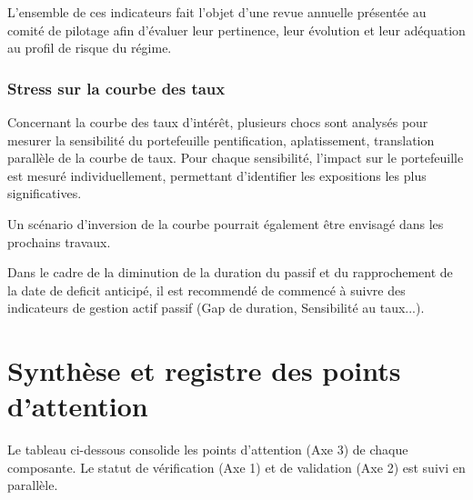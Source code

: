 \documentclass[11pt,a4paper]{article}
\begin{document}
L'ensemble de ces indicateurs fait l'objet d'une revue annuelle présentée au comité de pilotage afin d'évaluer leur pertinence, leur évolution et leur adéquation au profil de risque du régime.

\subsubsection*{Stress sur la courbe des taux}

Concernant la courbe des taux d’intérêt, plusieurs chocs sont analysés pour mesurer la sensibilité du portefeuille pentification, aplatissement, translation parallèle de la courbe de taux. 
Pour chaque sensibilité, l’impact sur le portefeuille est mesuré individuellement, permettant d’identifier les expositions les plus significatives.

\begin{minorrecbox}
Un scénario d’inversion de la courbe pourrait également être envisagé dans les prochains travaux.
\end{minorrecbox}

Dans le cadre de la diminution de la duration du passif et du rapprochement de la date de deficit anticipé, il est recommendé de commencé à suivre des indicateurs de gestion actif passif (Gap de duration, Sensibilité au taux...).

\section{Synthèse et registre des points d'attention}

Le tableau ci-dessous consolide les points d'attention (Axe 3) de chaque composante. Le statut de vérification (Axe 1) et de validation (Axe 2) est suivi en parallèle.
\end{document}
